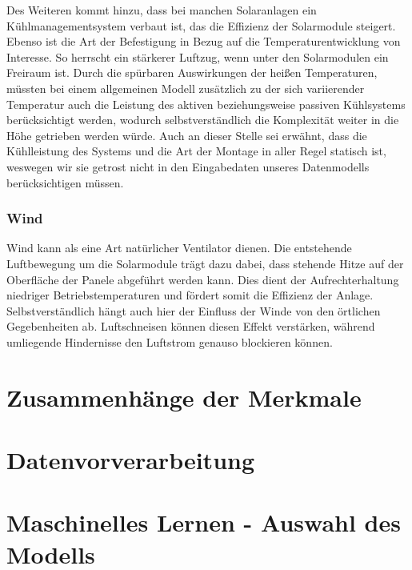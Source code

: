 \documentclass[12pt, a4paper]{article}
\begin{document}
Des Weiteren kommt hinzu, dass bei manchen Solaranlagen ein Kühlmanagementsystem verbaut ist, das die Effizienz der Solarmodule steigert. Ebenso ist die Art der Befestigung in Bezug auf die Temperaturentwicklung von Interesse. So herrscht ein stärkerer Luftzug, wenn unter den Solarmodulen ein Freiraum ist. Durch die spürbaren Auswirkungen der heißen Temperaturen, müssten bei einem allgemeinen Modell zusätzlich zu der sich variierender Temperatur auch die Leistung des aktiven beziehungsweise passiven Kühlsystems berücksichtigt werden, wodurch selbstverständlich die Komplexität weiter in die Höhe getrieben werden würde. Auch an dieser Stelle sei erwähnt, dass die Kühlleistung des Systems und die Art der Montage in aller Regel statisch ist, weswegen wir sie getrost nicht in den Eingabedaten unseres Datenmodells berücksichtigen müssen.

\subsubsection{Wind}

Wind kann als eine Art natürlicher Ventilator dienen. Die entstehende Luftbewegung um die Solarmodule trägt dazu dabei, dass stehende Hitze auf der Oberfläche der Panele abgeführt werden kann. Dies dient der Aufrechterhaltung niedriger Betriebstemperaturen und fördert somit die Effizienz der Anlage. Selbstverständlich hängt auch hier der Einfluss der Winde von den örtlichen Gegebenheiten ab. Luftschneisen können diesen Effekt verstärken, während umliegende Hindernisse den Luftstrom genauso blockieren können.













\newpage

\section{Zusammenhänge der Merkmale}

\newpage

\section{Datenvorverarbeitung}


\newpage

\section{Maschinelles Lernen - Auswahl des Modells}
\end{document}
